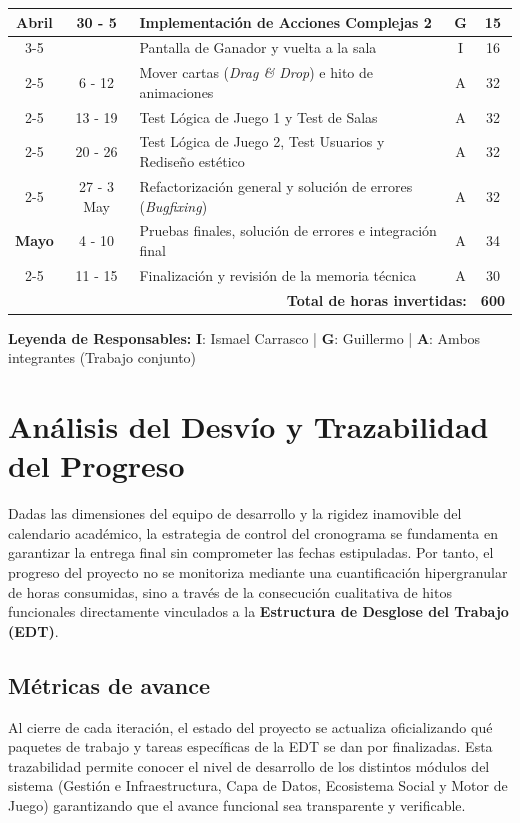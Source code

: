 \begin{longtable}{|c|c|p{7cm}|c|c|}
        \hline
        \textbf{Abril} 
        & \multirow{2}{*}{30 - 5} & Implementación de Acciones Complejas 2 & G & 15 \\ \cline{3-5}
        & & Pantalla de Ganador y vuelta a la sala & I & 16 \\ \cline{2-5}
        & 6 - 12 & Mover cartas (\textit{Drag \& Drop}) e hito de animaciones & A & 32 \\ \cline{2-5}
        & 13 - 19 & Test Lógica de Juego 1 y Test de Salas & A & 32 \\ \cline{2-5}
        & 20 - 26 & Test Lógica de Juego 2, Test Usuarios y Rediseño estético & A & 32 \\ \cline{2-5}
        & 27 - 3 May & Refactorización general y solución de errores (\textit{Bugfixing}) & A & 32 \\
        \hline
        \textbf{Mayo} 
        & 4 - 10 & Pruebas finales, solución de errores e integración final & A & 34 \\ \cline{2-5}
        & 11 - 15 & Finalización y revisión de la memoria técnica & A & 30 \\ \hline
        \multicolumn{4}{|r|}{\textbf{Total de horas invertidas:}} & \textbf{600} \\ \hline
\end{longtable}

\begin{center}
    \footnotesize
    \textbf{Leyenda de Responsables:} \textbf{I}: Ismael Carrasco | \textbf{G}: Guillermo | \textbf{A}: Ambos integrantes (Trabajo conjunto)
\end{center}

\section{Análisis del Desvío y Trazabilidad del Progreso}

Dadas las dimensiones del equipo de desarrollo y la rigidez inamovible del calendario académico, la estrategia de control del cronograma se fundamenta en garantizar la entrega final sin comprometer las fechas estipuladas. Por tanto, el progreso del proyecto no se monitoriza mediante una cuantificación hipergranular de horas consumidas, sino a través de la consecución cualitativa de hitos funcionales directamente vinculados a la \textbf{Estructura de Desglose del Trabajo (EDT)}.

\subsection{Métricas de avance}
Al cierre de cada iteración, el estado del proyecto se actualiza oficializando qué paquetes de trabajo y tareas específicas de la EDT se dan por finalizadas. Esta trazabilidad permite conocer el nivel de desarrollo de los distintos módulos del sistema (Gestión e Infraestructura, Capa de Datos, Ecosistema Social y Motor de Juego) garantizando que el avance funcional sea transparente y verificable.

